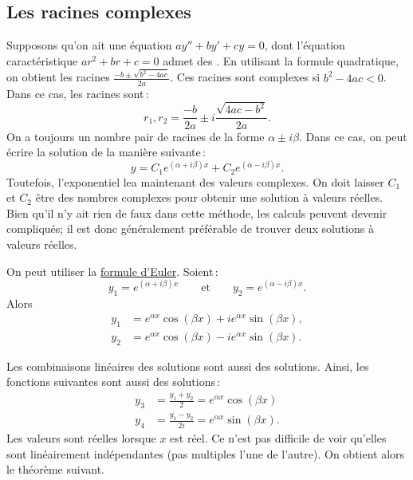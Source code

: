 \subsection{Les racines complexes}

Supposons qu'on ait une équation  $ay'' + by' + cy = 0$, dont  l'équation caractéristique 
$a r^2 + b r + c = 0$ admet des .
En utilisant la formule quadratique, on obtient les racines 
$\frac{-b \pm \sqrt{b^2 - 4ac}}{2a}$.
Ces racines sont complexes si $b^2 - 4ac < 0$.  Dans ce cas, les racines sont\,:
\begin{equation*}
r_1, r_2 = \frac{-b}{2a} \pm i\frac{\sqrt{4ac - b^2}}{2a} .
\end{equation*}
On a toujours un nombre pair de racines de la forme $\alpha \pm i
\beta$. Dans ce cas, on peut écrire la solution de la manière suivante\,:
\begin{equation*}
y = C_1 e^{(\alpha+i\beta)x} + C_2 e^{(\alpha-i\beta)x} .
\end{equation*}
Toutefois, l'exponentiel lea maintenant des valeurs complexes. On doit laisser  
$C_1$ et $C_2$ être des nombres complexes pour obtenir une solution à valeurs réelles. Bien qu'il n'y ait rien de faux dans cette méthode, les calculs peuvent devenir compliqués; il est donc généralement préférable de trouver deux solutions à valeurs réelles.

On peut utiliser la  \hyperref[eulersformula]{formule d'Euler}. Soient\,: 
\begin{equation*}
y_1 = e^{(\alpha+i\beta)x} \qquad \text{et} \qquad y_2 = e^{(\alpha-i\beta)x} .
\end{equation*}
Alors 
\begin{align*}
y_1 & = e^{\alpha x} \cos (\beta x) + i e^{\alpha x} \sin (\beta x) , \\
y_2 & = e^{\alpha x} \cos (\beta x) - i e^{\alpha x} \sin (\beta x) .
\end{align*}

Les combinaisons linéaires des solutions sont aussi des solutions. Ainsi, les fonctions suivantes sont aussi des solutions\,:
\begin{align*}
y_3 & = \frac{y_1 + y_2}{2} = e^{\alpha x} \cos (\beta x)  \\ 
y_4 & = \frac{y_1 - y_2}{2i} = e^{\alpha x} \sin (\beta x) .
\end{align*}
Les valeurs sont réelles lorsque $x$ est réel. Ce n'est pas difficile de voir qu'elles sont linéairement indépendantes (pas multiples l'une de l'autre). On obtient alors le théorème suivant.

